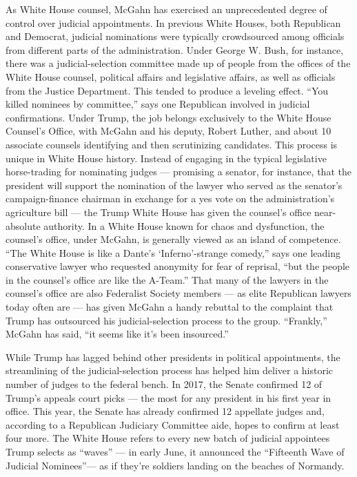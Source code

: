As White House counsel, McGahn has exercised an unprecedented degree of
control over judicial appointments. In previous White Houses, both
Republican and Democrat, judicial nominations were typically
crowdsourced among officials from different parts of the administration.
Under George W. Bush, for instance, there was a judicial-selection
committee made up of people from the offices of the White House counsel,
political affairs and legislative affairs, as well as officials from the
Justice Department. This tended to produce a leveling effect. ``You
killed nominees by committee,'' says one Republican involved in judicial
confirmations. Under Trump, the job belongs exclusively to the White
House Counsel's Office, with McGahn and his deputy, Robert Luther, and
about 10 associate counsels identifying and then scrutinizing
candidates. This process is unique in White House history. Instead of
engaging in the typical legislative horse-trading for nominating judges
--- promising a senator, for instance, that the president will support
the nomination of the lawyer who served as the senator's
campaign-finance chairman in exchange for a yes vote on the
administration's agriculture bill --- the Trump White House has given
the counsel's office near-absolute authority. In a White House known for
chaos and dysfunction, the counsel's office, under McGahn, is generally
viewed as an island of competence. ``The White House is like a Dante's
`Inferno'-strange comedy,'' says one leading conservative lawyer who
requested anonymity for fear of reprisal, ``but the people in the
counsel's office are like the A-Team.'' That many of the lawyers in the
counsel's office are also Federalist Society members --- as elite
Republican lawyers today often are --- has given McGahn a handy rebuttal
to the complaint that Trump has outsourced his judicial-selection
process to the group. ``Frankly,'' McGahn has said, ``it seems like it's
been insourced.''

While Trump has lagged behind other presidents in political
appointments, the streamlining of the judicial-selection process has
helped him deliver a historic number of judges to the federal bench. In
2017, the Senate confirmed 12 of Trump's appeals court picks --- the
most for any president in his first year in office. This year, the
Senate has already confirmed 12 appellate judges and, according to a
Republican Judiciary Committee aide, hopes to confirm at least four
more. The White House refers to every new batch of judicial appointees
Trump selects as ``waves'' --- in early June, it announced the
``Fifteenth Wave of Judicial Nominees''--- as if they're soldiers
landing on the beaches of Normandy.


